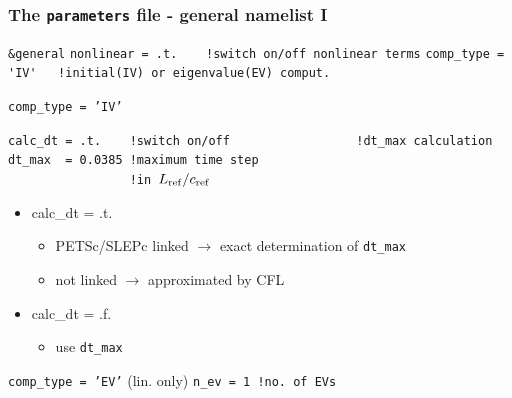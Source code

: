 \documentclass[9pt]{beamer}
\begin{document}
\begin{frame}[fragile]
  \frametitle{The {\tt parameters} file - general namelist I}

\begin{block}%

\begin{block}

\verb|&general|
\verb|nonlinear = .t.    !switch on/off nonlinear terms|
\verb|comp_type = 'IV'   !initial(IV) or eigenvalue(EV) comput.|
\end{block}
\begin{minipage}[t]{0.575\textwidth}
\small
 \begin{block}{{\tt comp\_type = 'IV'}}

\verb|calc_dt = .t.    !switch on/off|
\verb|                 !dt_max calculation|
\verb|dt_max  = 0.0385 !maximum time step |\\
\verb|                 !in |$L_{\rm ref}/c_{\rm ref}$
\end{block}
\begin{itemize}
\item calc\_dt = .t.
\begin{itemize}
\item PETSc/SLEPc linked $\rightarrow$ exact determination of {\tt dt\_max}
\item not linked $\rightarrow$ approximated by CFL
\end{itemize}
\item calc\_dt = .f.
\begin{itemize}
\item use {\tt dt\_max}
\end{itemize}
\end{itemize}

\end{minipage}
\hspace{0.02\textwidth}
\begin{minipage}[t]{0.385\textwidth}
 \begin{block}{{\tt comp\_type = 'EV'} (lin. only)}
\verb|n_ev = 1 !no. of EVs|
 \end{block}
\end{minipage}
\end{block}
\end{frame}

\end{document}

